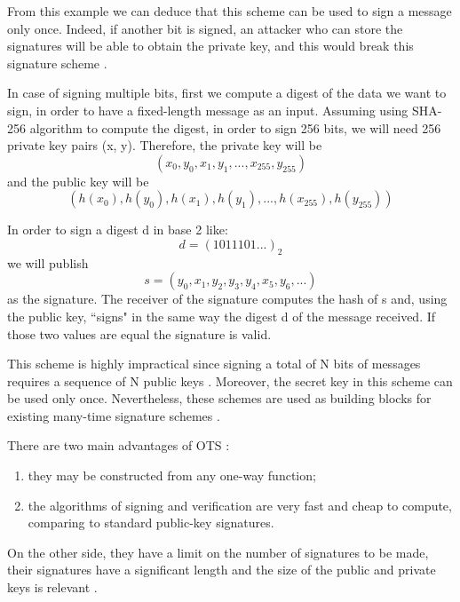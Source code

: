 \documentclass[a4paper,12pt]{article}
\begin{document}
From this example we can deduce that this scheme can be used to sign a message only once. Indeed, if another bit is signed, an attacker who can store the signatures will be able to obtain the private key, and this would break this signature scheme \cite{53_hbs}.

In case of signing multiple bits, first we compute a digest of the data we want to sign, in order to have a fixed-length message as an input. Assuming using SHA-256 algorithm to compute the digest, in order to sign 256 bits, we will need 256 private key pairs (x, y). Therefore, the private key will be $$(x_{0}, y_{0}, x_{1}, y_{1}, ... , x_{255}, y_{255})$$ and the public key will be $$(h(x_{0}),h(y_{0}),h(x_{1}),h(y_{1}),...,h(x_{255}),h(y_{255}))$$

In order to sign a digest d in base 2 like:
$$d = (1011101...)_{2}$$
we will publish $$s = (y_{0}, x_{1}, y_{2}, y_{3}, y_{4}, x_{5}, y_{6},...)$$ as the signature.
The receiver of the signature computes the hash of s and, using the public key, ``signs" in the same way the digest d of the message received. If those two values are equal the signature is valid.

This scheme is highly impractical since signing a total of N bits of messages requires a sequence of N public keys \cite{1_sphincspaper}. Moreover, the secret key in this scheme can be used only once. Nevertheless, these schemes are used as building blocks for existing many-time signature schemes \cite{7_hashbased}.

There are two main advantages of OTS \cite{53_hbs}:
\begin{enumerate}
	\item they may be constructed from any one-way function;
	\item the algorithms of signing and verification are very fast and cheap to compute, comparing to standard public-key signatures.
\end{enumerate}

On the other side, they have a limit on the number of signatures to be made, their signatures have a significant length and the size of the public and private keys is relevant \cite{45_ShortOTS}.
\end{document}

